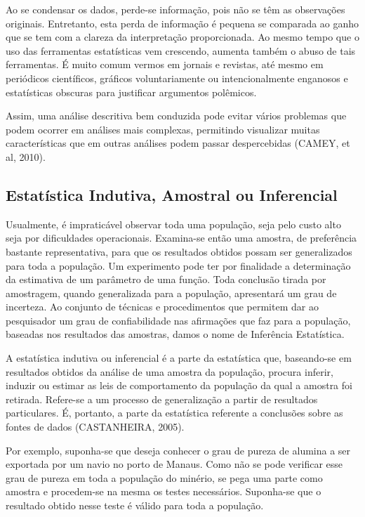  Ao se condensar os dados, perde-se informação, pois não se têm as observações originais. Entretanto, esta perda de informação é pequena se comparada ao ganho que se tem com a clareza da interpretação proporcionada. Ao mesmo tempo que o uso das ferramentas estatísticas vem crescendo, aumenta também o abuso de tais ferramentas. É muito comum vermos em jornais e revistas, até mesmo em periódicos científicos, gráficos voluntariamente ou intencionalmente enganosos e estatísticas obscuras para justificar argumentos polêmicos.\vskip0.3cm


Assim, uma análise descritiva bem conduzida pode evitar vários problemas que podem ocorrer em análises mais complexas, permitindo  visualizar  muitas  características que  em  outras  análises  podem  passar  despercebidas (CAMEY, et al, 2010).






\subsection{Estatística Indutiva, Amostral ou Inferencial}

\inic Usualmente, é impraticável observar toda uma população, seja pelo custo alto seja por dificuldades operacionais. Examina-se então uma amostra, de preferência bastante representativa, para que os resultados obtidos possam ser generalizados para toda a população. Um experimento pode ter por finalidade a determinação da estimativa de um parâmetro de uma função. Toda conclusão tirada por amostragem, quando generalizada para a população, apresentará um grau de incerteza. Ao conjunto de técnicas e procedimentos que permitem dar ao pesquisador um grau de confiabilidade nas afirmações que faz para a população, baseadas nos resultados das amostras, damos o nome de Inferência Estatística.\vskip0.3cm

A estatística indutiva ou inferencial é a parte da estatística que, baseando-se em resultados obtidos da análise de uma amostra da população, procura inferir, induzir ou estimar as leis de comportamento da população da qual a amostra foi retirada. Refere-se a um processo de generalização a partir de resultados particulares. É, portanto, a parte da estatística referente a conclusões sobre as fontes de dados (CASTANHEIRA, 2005).\vskip0.3cm


Por exemplo, suponha-se que deseja conhecer o grau de pureza de alumina a ser exportada por um navio no porto de Manaus. Como não se pode verificar esse grau de pureza em toda a população do minério, se pega uma parte como amostra e procedem-se na mesma os testes necessários. Suponha-se que o resultado obtido nesse teste é válido para toda a população.\vskip0.3cm

